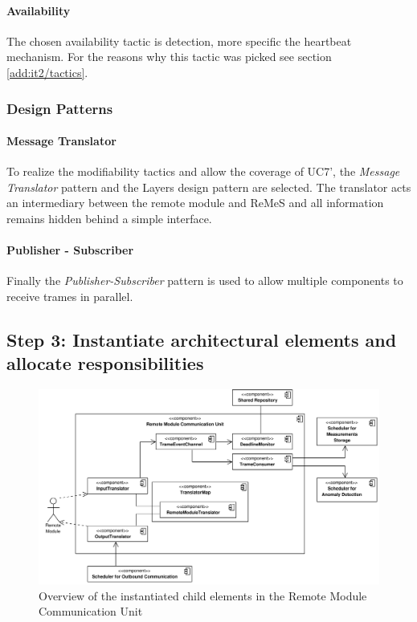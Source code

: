 \paragraph{Availability}

\npar The chosen availability tactic is detection, more specific the heartbeat
mechanism. For the reasons why this tactic was picked see section
\ref{add:it2/tactics}.

\subsubsection{Design Patterns}
\label{add:it2/patterns}

\paragraph{Message Translator}

\npar To realize the modifiability tactics and allow the coverage of UC7', the
\emph{Message Translator} pattern \citep[see][p.~229]{Buschmann:07} and the
Layers design pattern \citep[see][p.~185]{Buschmann:07} are selected.
The translator acts an intermediary between the remote module and ReMeS and all
information remains hidden behind a simple interface.

\paragraph{Publisher - Subscriber}

\npar Finally the \emph{Publisher-Subscriber} pattern
\citep[see][p.~234]{Buschmann:07} is used to allow multiple components to
receive trames in parallel.

\subsection{Step 3: Instantiate architectural elements and allocate responsibilities}
\label{add:it2/elements}

\begin{figure}[H]
	\begin{centering}
		\includegraphics[width=\textwidth]{figs/add-it2-elements.pdf}
		\caption{Overview of the instantiated child elements in the Remote Module
		Communication Unit}
		\label{fig:it2/elements}
	\end{centering}
\end{figure}

